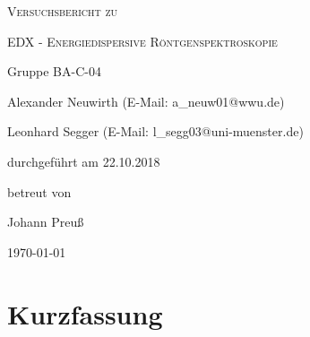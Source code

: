 \documentclass[
	a4paper,
	12pt,
	pagesize,
	ngerman
]{scrartcl}
\begin{document}
	
	\begin{titlepage}
		\centering
		{\scshape\LARGE Versuchsbericht zu \par}
		\vspace{1cm}
		{\scshape\huge EDX - Energiedispersive Röntgenspektroskopie \par}
		\vspace{2.5cm}
		{\LARGE Gruppe BA-C-04 \par}
		\vspace{0.5cm}
		
		{\large Alexander Neuwirth (E-Mail: a\_neuw01@wwu.de) \par}
		{\large Leonhard Segger (E-Mail: l\_segg03@uni-muenster.de) \par}
		\vfill
		
		durchgeführt am 22.10.2018\par
		betreut von\par
		{\large Johann Preuß} %
		
		\vfill
		
		{\large \today\par}
	\end{titlepage}
	\tableofcontents
	\newpage


	\section{Kurzfassung}
	
	
	
\end{document}
